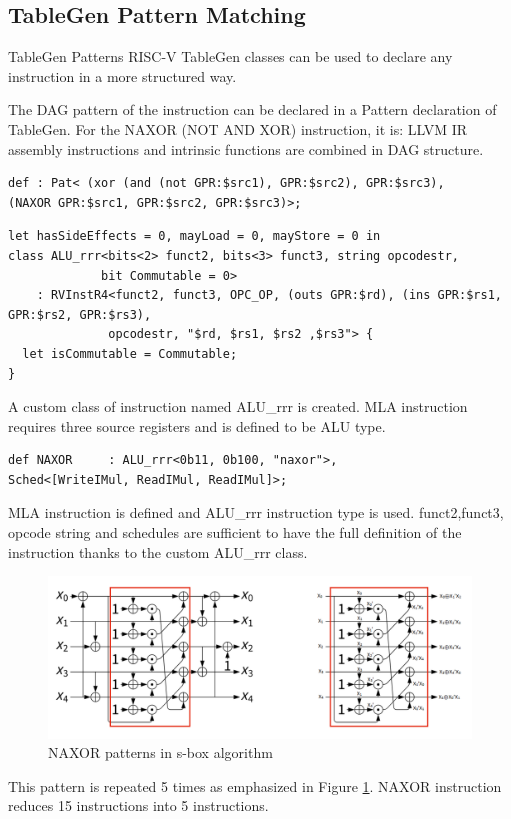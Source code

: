 \subsection{TableGen Pattern Matching}
\begin{frame}[fragile]{TableGen Patterns}
RISC-V TableGen classes can be used to declare any instruction in a more structured way.
\par
The DAG pattern of the instruction can be declared in a Pattern declaration of TableGen. For the NAXOR (NOT AND XOR) instruction, it is: LLVM IR assembly instructions and intrinsic functions are combined in DAG structure.

\begin{lstlisting}
def : Pat< (xor (and (not GPR:$src1), GPR:$src2), GPR:$src3),
(NAXOR GPR:$src1, GPR:$src2, GPR:$src3)>;
\end{lstlisting}
\end{frame}

        
        

\begin{lstlisting}
let hasSideEffects = 0, mayLoad = 0, mayStore = 0 in
class ALU_rrr<bits<2> funct2, bits<3> funct3, string opcodestr,
             bit Commutable = 0>
    : RVInstR4<funct2, funct3, OPC_OP, (outs GPR:$rd), (ins GPR:$rs1, GPR:$rs2, GPR:$rs3),
              opcodestr, "$rd, $rs1, $rs2 ,$rs3"> {
  let isCommutable = Commutable;
}
\end{lstlisting}
A custom class of instruction named ALU_rrr is created. MLA instruction requires three source registers and is defined to be ALU type. 



        
\begin{lstlisting}
def NAXOR     : ALU_rrr<0b11, 0b100, "naxor">,
Sched<[WriteIMul, ReadIMul, ReadIMul]>;
\end{lstlisting}
MLA instruction is defined and ALU_rrr instruction type is used. funct2,funct3, opcode string and schedules are sufficient to have the full definition of the instruction thanks to the custom ALU_rrr class.




\begin{figure}
    \centering
    \includegraphics[scale=0.3]{sbox_naxor_pattern.png}
    \caption{NAXOR patterns in s-box algorithm}
    \label{fig:sbox_naxor_pattern}
\end{figure}
This pattern is repeated 5 times as emphasized in Figure \ref{fig:sbox_naxor_pattern}. NAXOR instruction reduces 15 instructions into 5 instructions.




